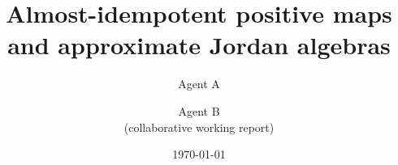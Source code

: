 \documentclass[11pt]{article}
\title{Almost-idempotent positive maps\\ and approximate Jordan algebras}
\author{Agent A \and Agent B\\[2pt]\small (collaborative working report)}
\date{\today}
\theoremstyle{plain}
\theoremstyle{definition}
\begin{document}
\maketitle

\begin{abstract}

\end{abstract}

\tableofcontents
\bigskip
















\end{document}
